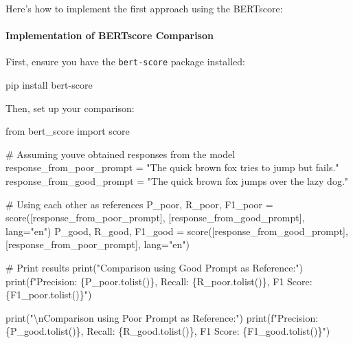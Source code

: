 \documentclass[
]{agujournal2019}
\let\oldparagraph\paragraph
\renewcommand{\paragraph}[1]{\oldparagraph{#1}\mbox{}}
\newenvironment{Shaded}{\begin{snugshade}}{\end{snugshade}}
\newcommand{\BuiltInTok}[1]{\textcolor[rgb]{0.00,0.23,0.31}{#1}}
\newcommand{\CharTok}[1]{\textcolor[rgb]{0.13,0.47,0.30}{#1}}
\newcommand{\CommentTok}[1]{\textcolor[rgb]{0.37,0.37,0.37}{#1}}
\newcommand{\ExtensionTok}[1]{\textcolor[rgb]{0.00,0.23,0.31}{#1}}
\newcommand{\ImportTok}[1]{\textcolor[rgb]{0.00,0.46,0.62}{#1}}
\newcommand{\NormalTok}[1]{\textcolor[rgb]{0.00,0.23,0.31}{#1}}
\newcommand{\OperatorTok}[1]{\textcolor[rgb]{0.37,0.37,0.37}{#1}}
\newcommand{\SpecialCharTok}[1]{\textcolor[rgb]{0.37,0.37,0.37}{#1}}
\newcommand{\SpecialStringTok}[1]{\textcolor[rgb]{0.13,0.47,0.30}{#1}}
\newcommand{\StringTok}[1]{\textcolor[rgb]{0.13,0.47,0.30}{#1}}
\begin{document}
Here's how to implement the first approach using the BERTscore:

\paragraph{Implementation of BERTscore
Comparison}\label{implementation-of-bertscore-comparison}

First, ensure you have the \texttt{bert-score} package installed:

\begin{Shaded}
\begin{Highlighting}[]
\ExtensionTok{pip}\NormalTok{ install bert{-}score}
\end{Highlighting}
\end{Shaded}

Then, set up your comparison:

\begin{Shaded}
\begin{Highlighting}[]
\ImportTok{from}\NormalTok{ bert\_score }\ImportTok{import}\NormalTok{ score}

\CommentTok{\# Assuming you\textquotesingle{}ve obtained responses from the model}
\NormalTok{response\_from\_poor\_prompt }\OperatorTok{=} \StringTok{"The quick brown fox tries to jump but fails."}
\NormalTok{response\_from\_good\_prompt }\OperatorTok{=} \StringTok{"The quick brown fox jumps over the lazy dog."}

\CommentTok{\# Using each other as references}
\NormalTok{P\_poor, R\_poor, F1\_poor }\OperatorTok{=}\NormalTok{ score([response\_from\_poor\_prompt], [response\_from\_good\_prompt], lang}\OperatorTok{=}\StringTok{"en"}\NormalTok{)}
\NormalTok{P\_good, R\_good, F1\_good }\OperatorTok{=}\NormalTok{ score([response\_from\_good\_prompt], [response\_from\_poor\_prompt], lang}\OperatorTok{=}\StringTok{"en"}\NormalTok{)}

\CommentTok{\# Print results}
\BuiltInTok{print}\NormalTok{(}\StringTok{"Comparison using Good Prompt as Reference:"}\NormalTok{)}
\BuiltInTok{print}\NormalTok{(}\SpecialStringTok{f"Precision: }\SpecialCharTok{\{}\NormalTok{P\_poor}\SpecialCharTok{.}\NormalTok{tolist()}\SpecialCharTok{\}}\SpecialStringTok{, Recall: }\SpecialCharTok{\{}\NormalTok{R\_poor}\SpecialCharTok{.}\NormalTok{tolist()}\SpecialCharTok{\}}\SpecialStringTok{, F1 Score: }\SpecialCharTok{\{}\NormalTok{F1\_poor}\SpecialCharTok{.}\NormalTok{tolist()}\SpecialCharTok{\}}\SpecialStringTok{"}\NormalTok{)}

\BuiltInTok{print}\NormalTok{(}\StringTok{"}\CharTok{\textbackslash{}n}\StringTok{Comparison using Poor Prompt as Reference:"}\NormalTok{)}
\BuiltInTok{print}\NormalTok{(}\SpecialStringTok{f"Precision: }\SpecialCharTok{\{}\NormalTok{P\_good}\SpecialCharTok{.}\NormalTok{tolist()}\SpecialCharTok{\}}\SpecialStringTok{, Recall: }\SpecialCharTok{\{}\NormalTok{R\_good}\SpecialCharTok{.}\NormalTok{tolist()}\SpecialCharTok{\}}\SpecialStringTok{, F1 Score: }\SpecialCharTok{\{}\NormalTok{F1\_good}\SpecialCharTok{.}\NormalTok{tolist()}\SpecialCharTok{\}}\SpecialStringTok{"}\NormalTok{)}
\end{Highlighting}
\end{Shaded}
\end{document}
